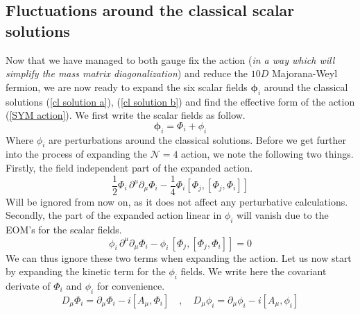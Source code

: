 \subsection{Fluctuations around the classical scalar solutions}\label{fluct cl}
Now that we have managed to both gauge fix the action (\textit{in a way which will simplify the mass matrix diagonalization}) and reduce the $10D$ Majorana-Weyl fermion, we are now ready to expand the six scalar fields $\boldsymbol{\phi}_i$ around the classical solutions (\ref{cl solution a}), (\ref{cl solution b}) and find the effective form of the action (\ref{SYM action}). We first write the scalar fields as follow.
%
%
\begin{equation}
\boldsymbol{\phi}_i = \Phi_i + \phi_i
\end{equation}
%
%
Where $\phi_i$ are perturbations around the classical solutions. Before we get further into the process of expanding the $\mathcal{N} = 4$ action, we note the following two things. Firstly, the field independent part of the expanded action.
%
%
\begin{equation}
\frac{1}{2} \Phi_i \, \partial^\mu \partial_\mu \Phi_i
- \frac{1}{4} \Phi_i [\Phi_j, [\Phi_j, \Phi_i]]
\end{equation}
%
%
Will be ignored from now on, as it does not affect any perturbative calculations. Secondly, the part of the expanded action linear in $\phi_i$ will vanish due to the EOM's for the scalar fields.
%
%
\begin{equation}
\phi_i \, \partial^\mu \partial_\mu \Phi_i
- \phi_i \, [\Phi_j, [\Phi_j, \Phi_i]]
= 0
\end{equation}
%
%
We can thus ignore these two terms when expanding the action.
%
Let us now start by expanding the kinetic term for the $\phi_i$ fields. We write here the covariant derivate of $\Phi_i$ and $\phi_i$ for convenience.
%
%
\begin{equation}
D_\mu \Phi_i = \partial_\mu \Phi_i -i [A_\mu, \Phi_i]
%
\quad , \quad
%
D_\mu \phi_i = \partial_\mu \phi_i -i [A_\mu, \phi_i]
\end{equation}
